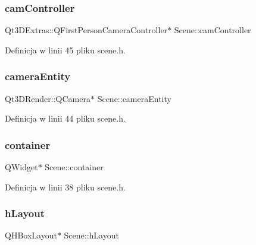 \subsubsection{\texorpdfstring{cam\+Controller}{camController}}
{\footnotesize\ttfamily Qt3\+D\+Extras\+::\+Q\+First\+Person\+Camera\+Controller$\ast$ Scene\+::cam\+Controller\hspace{0.3cm}{\ttfamily [private]}}



Definicja w linii 45 pliku scene.\+h.

\mbox{\label{class_scene_aed08c4ba793fa5d32104d47c9cfd2c5c}} 
\subsubsection{\texorpdfstring{camera\+Entity}{cameraEntity}}
{\footnotesize\ttfamily Qt3\+D\+Render\+::\+Q\+Camera$\ast$ Scene\+::camera\+Entity\hspace{0.3cm}{\ttfamily [private]}}



Definicja w linii 44 pliku scene.\+h.

\mbox{\label{class_scene_a10832d33619bdb86c51bb75377ea649d}} 
\subsubsection{\texorpdfstring{container}{container}}
{\footnotesize\ttfamily Q\+Widget$\ast$ Scene\+::container\hspace{0.3cm}{\ttfamily [private]}}



Definicja w linii 38 pliku scene.\+h.

\mbox{\label{class_scene_a285ea7ad07d9419d79fccbde3a9f8388}} 
\subsubsection{\texorpdfstring{h\+Layout}{hLayout}}
{\footnotesize\ttfamily Q\+H\+Box\+Layout$\ast$ Scene\+::h\+Layout\hspace{0.3cm}{\ttfamily [private]}}




